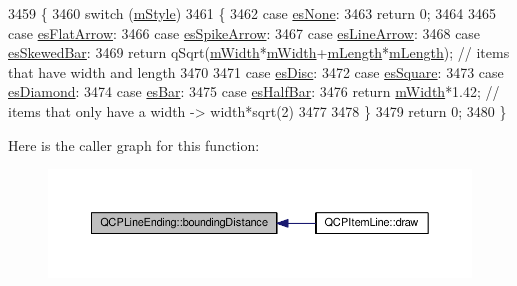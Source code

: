 \begin{DoxyCode}
3459 \{
3460   \textcolor{keywordflow}{switch} (\hyperlink{class_q_c_p_line_ending_a4696fc9117b60f1ca7690fcd2ba56611}{mStyle})
3461   \{
3462     \textcolor{keywordflow}{case} \hyperlink{class_q_c_p_line_ending_a5ef16e6876b4b74959c7261d8d4c2cd5aca12d500f50cd6871766801bac30fb03}{esNone}:
3463       \textcolor{keywordflow}{return} 0;
3464       
3465     \textcolor{keywordflow}{case} \hyperlink{class_q_c_p_line_ending_a5ef16e6876b4b74959c7261d8d4c2cd5a3d7dcea2f100671727c3417142154f8f}{esFlatArrow}:
3466     \textcolor{keywordflow}{case} \hyperlink{class_q_c_p_line_ending_a5ef16e6876b4b74959c7261d8d4c2cd5ab9964d0d03f812d1e79de15edbeb2cbf}{esSpikeArrow}:
3467     \textcolor{keywordflow}{case} \hyperlink{class_q_c_p_line_ending_a5ef16e6876b4b74959c7261d8d4c2cd5a61f78ee8f375fb21cb9d250687bbcbd2}{esLineArrow}:
3468     \textcolor{keywordflow}{case} \hyperlink{class_q_c_p_line_ending_a5ef16e6876b4b74959c7261d8d4c2cd5a2b2cc96e757ca9bcd91fb70221ed43ab}{esSkewedBar}:
3469       \textcolor{keywordflow}{return} qSqrt(\hyperlink{class_q_c_p_line_ending_aca89d21341133c20dc6825c33a5eac48}{mWidth}*\hyperlink{class_q_c_p_line_ending_aca89d21341133c20dc6825c33a5eac48}{mWidth}+\hyperlink{class_q_c_p_line_ending_ae8e1e2566b96c05736cd92662dba8af8}{mLength}*\hyperlink{class_q_c_p_line_ending_ae8e1e2566b96c05736cd92662dba8af8}{mLength}); \textcolor{comment}{// items that have width and
       length}
3470       
3471     \textcolor{keywordflow}{case} \hyperlink{class_q_c_p_line_ending_a5ef16e6876b4b74959c7261d8d4c2cd5ae5a3414916817258bcc6dddd605e8f5c}{esDisc}:
3472     \textcolor{keywordflow}{case} \hyperlink{class_q_c_p_line_ending_a5ef16e6876b4b74959c7261d8d4c2cd5ae1836502fa43d8990bb62b2d493a140a}{esSquare}:
3473     \textcolor{keywordflow}{case} \hyperlink{class_q_c_p_line_ending_a5ef16e6876b4b74959c7261d8d4c2cd5a378fe5a8b768411b0bc1765210fe7200}{esDiamond}:
3474     \textcolor{keywordflow}{case} \hyperlink{class_q_c_p_line_ending_a5ef16e6876b4b74959c7261d8d4c2cd5a2cf543bbca332df26d89bf779f50469f}{esBar}:
3475     \textcolor{keywordflow}{case} \hyperlink{class_q_c_p_line_ending_a5ef16e6876b4b74959c7261d8d4c2cd5a126c390f0c359fcd8df1fc5e38d26d5b}{esHalfBar}:
3476       \textcolor{keywordflow}{return} \hyperlink{class_q_c_p_line_ending_aca89d21341133c20dc6825c33a5eac48}{mWidth}*1.42; \textcolor{comment}{// items that only have a width -> width*sqrt(2)}
3477 
3478   \}
3479   \textcolor{keywordflow}{return} 0;
3480 \}
\end{DoxyCode}


Here is the caller graph for this function\+:\nopagebreak
\begin{figure}[H]
\begin{center}
\leavevmode
\includegraphics[width=350pt]{class_q_c_p_line_ending_a586b45cf738881a70119e353dc1ed59c_icgraph}
\end{center}
\end{figure}


